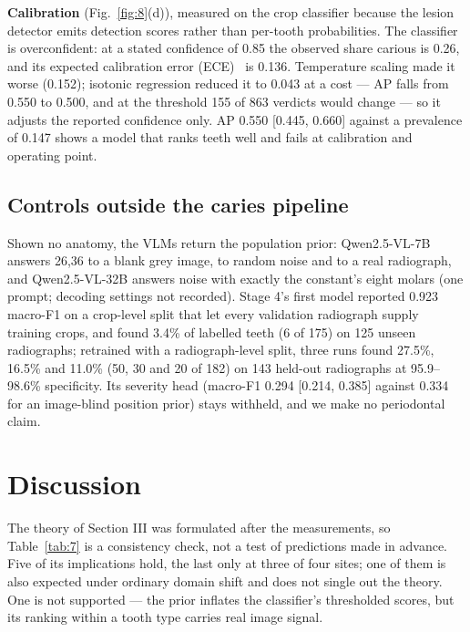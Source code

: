 \documentclass[conference]{IEEEtran}
\begin{document}
\textbf{Calibration} (Fig.~\ref{fig:8}(d)), measured on the crop classifier because the lesion detector emits detection scores rather than per-tooth probabilities. The classifier is overconfident: at a stated confidence of 0.85 the observed share carious is 0.26, and its expected calibration error (ECE)~\cite{naeini2015obtaining,guo2017calibration} is 0.136. Temperature scaling made it worse (0.152); isotonic regression reduced it to 0.043 at a cost — AP falls from 0.550 to 0.500, and at the threshold 155 of 863 verdicts would change — so it adjusts the reported confidence only. AP 0.550 [0.445, 0.660] against a prevalence of 0.147 shows a model that ranks teeth well and fails at calibration and operating point.

\subsection{Controls outside the caries pipeline}

Shown no anatomy, the VLMs return the population prior: Qwen2.5-VL-7B answers 26,36 to a blank grey image, to random noise and to a real radiograph, and Qwen2.5-VL-32B answers noise with exactly the constant's eight molars (one prompt; decoding settings not recorded). Stage 4's first model reported 0.923 macro-F1 on a crop-level split that let every validation radiograph supply training crops, and found 3.4\% of labelled teeth (6 of 175) on 125 unseen radiographs; retrained with a radiograph-level split, three runs found 27.5\%, 16.5\% and 11.0\% (50, 30 and 20 of 182) on 143 held-out radiographs at 95.9–98.6\% specificity. Its severity head (macro-F1 0.294 [0.214, 0.385] against 0.334 for an image-blind position prior) stays withheld, and we make no periodontal claim.

\section{Discussion}

The theory of Section III was formulated after the measurements, so Table~\ref{tab:7} is a consistency check, not a test of predictions made in advance. Five of its implications hold, the last only at three of four sites; one of them is also expected under ordinary domain shift and does not single out the theory. One is not supported — the prior inflates the classifier's thresholded scores, but its ranking within a tooth type carries real image signal.
\end{document}
